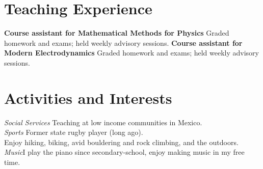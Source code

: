 \documentclass[a4paper,11pt,notitlepage]{article}
\begin{document}
\section{Teaching Experience}
\begin{outline}
    \1 {\bf Course assistant for Mathematical Methods for Physics} 
    \2 Graded homework and exams; held weekly advisory sessions.
    \1 {\bf Course assistant for Modern Electrodynamics}  
    \2 Graded homework and exams; held weekly advisory sessions.
%   
\end{outline}
\medskip
    \section{Activities and Interests}
    \emph{Social Services} \hfill Teaching at low income communities in Mexico.\\
    \emph{Sports} \hfill Former state rugby player (long ago).\\
    \phantom{text}\hfill Enjoy hiking, biking, avid bouldering and rock climbing, and the outdoors.\\
    \emph{Music}\hfill I play the piano since secondary-school, enjoy making music in my free time.\\
\vfill
\end{document}
